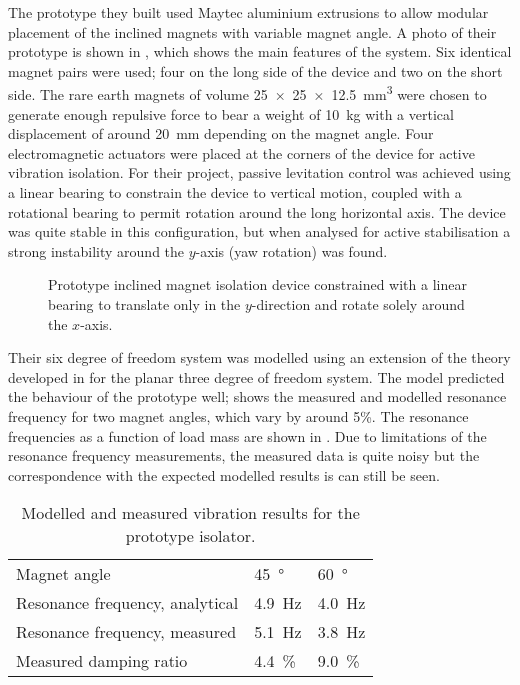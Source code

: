 The prototype they built used Maytec  aluminium extrusions to allow modular placement of the inclined magnets with variable magnet angle.
A photo of their prototype is shown in , which shows the main features of the system.
Six identical magnet pairs were used; four on the long side of the device and two on the short side.
The rare earth magnets of volume \SI{25x25x12.5}{mm^3} were chosen to generate enough repulsive force to bear a weight of \SI{10}{kg} with a vertical displacement of around \SI{20}{mm} depending on the magnet angle.
Four electromagnetic actuators were placed at the corners of the device for active vibration isolation.
For their project, passive levitation control was achieved using a linear bearing to constrain the device to vertical motion, coupled with a rotational bearing to permit rotation around the long horizontal axis.
The device was quite stable in this configuration, but when analysed for active stabilisation a strong instability around the $y$-axis (yaw rotation) was found.

\begin{figure}
\begin{wide}
\end{wide}
\caption{Prototype inclined magnet isolation device constrained with a linear bearing to translate only in the $y$-direction and rotate solely around the $x$-axis.}
\end{figure}

Their six degree of freedom system was modelled using an extension of the theory developed in  for the planar three degree of freedom system.
The model predicted the behaviour of the prototype well;  shows the measured and modelled resonance frequency for two magnet angles, which vary by around 5\%.
The resonance frequencies as a function of load mass are shown in .
Due to limitations of the resonance frequency measurements, the measured data is quite noisy but the correspondence with the expected modelled results is can still be seen.

\begin{table}
\caption{Modelled and measured vibration results for the prototype isolator.}
\begin{tabular}{@{}lll@{}}
\toprule
Magnet angle & \SI{45}{\degree} & \SI{60}{\degree} \\
Resonance frequency, analytical & \SI{4.9}{Hz} & \SI{4.0}{Hz} \\
Resonance frequency, measured & \SI{5.1}{Hz} & \SI{3.8}{Hz} \\
Measured damping ratio & \SI{4.4}{\%} & \SI{9.0}{\%} \\
\bottomrule
\end{tabular}
\end{table}

